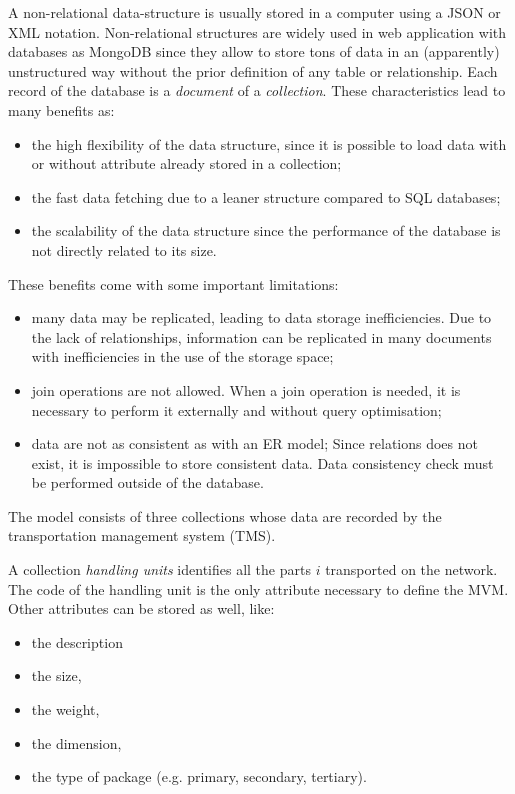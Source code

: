 A non-relational data-structure is usually stored in a computer using a JSON or XML notation. Non-relational structures are widely used in web application with databases as MongoDB since they allow to store tons of data in an (apparently) unstructured way without the prior definition of any table or relationship. Each record of the database is a \textit{document} of a \textit{collection}. These characteristics lead to many benefits as:

\begin{itemize}
    \item the high flexibility of the data structure, since it is possible to load data with or without attribute already stored in a collection;
    \item the fast data fetching due to a leaner structure compared to SQL databases;
    \item the scalability of the data structure since the performance of the database is not directly related to its size.

\end{itemize}

These benefits come with some important limitations:

\begin{itemize}
    \item many data may be replicated, leading to data storage inefficiencies. Due to the lack of relationships, information can be replicated in many documents with inefficiencies in the use of the storage space;
    \item join operations are not allowed. When a join operation is needed, it is necessary to perform it externally and without query optimisation;
    \item data are not as consistent as with an ER model; Since relations does not exist, it is impossible to store consistent data. Data consistency check must be performed outside of the database.

\end{itemize}

The model consists of three collections whose data are recorded by the transportation management system (TMS). \par

A collection \textit{handling units} identifies all the parts $i$ transported on the network. The code of the handling unit is the only attribute necessary to define the MVM. Other attributes can be stored as well, like:

\begin{itemize}
    \item the description
	\item the size, 
    \item the weight,
    \item the dimension,
    \item the type of package (e.g. primary, secondary, tertiary).
\end{itemize}

